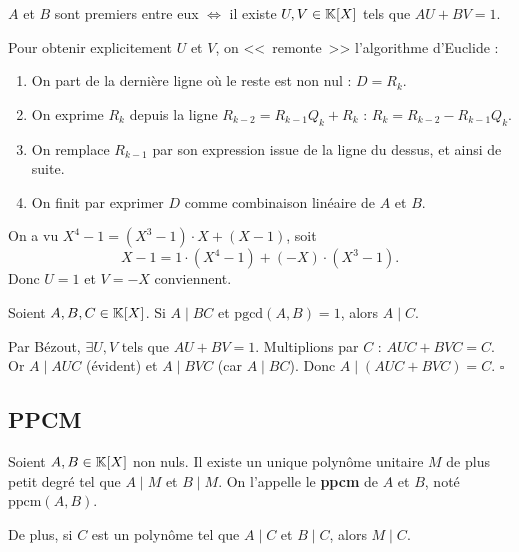 \begin{corollaire}
$A$ et $B$ sont premiers entre eux $\iff$ il existe $U, V \in \mathbb{K}[X]$ tels que $AU + BV = 1$.
\end{corollaire}

\begin{methodbox}
Pour obtenir explicitement $U$ et $V$, on <<~remonte~>> l'algorithme d'Euclide :
\begin{enumerate}[leftmargin=1.5cm]
  \item On part de la dernière ligne où le reste est non nul : $D = R_k$.
  \item On exprime $R_k$ depuis la ligne $R_{k-2} = R_{k-1} Q_k + R_k$ : $R_k = R_{k-2} - R_{k-1} Q_k$.
  \item On remplace $R_{k-1}$ par son expression issue de la ligne du dessus, et ainsi de suite.
  \item On finit par exprimer $D$ comme combinaison linéaire de $A$ et $B$.
\end{enumerate}
\end{methodbox}

\begin{exbox}
On a vu $X^4 - 1 = (X^3 - 1) \cdot X + (X - 1)$, soit
\[
  X - 1 = 1 \cdot (X^4 - 1) + (-X) \cdot (X^3 - 1).
\]
Donc $U = 1$ et $V = -X$ conviennent.
\end{exbox}

\begin{corollaire}
Soient $A, B, C \in \mathbb{K}[X]$. Si $A \mid BC$ et $\text{pgcd}(A, B) = 1$, alors $A \mid C$.
\end{corollaire}

\begin{proofbox}
Par Bézout, $\exists U, V$ tels que $AU + BV = 1$. Multiplions par $C$ : $A U C + B V C = C$. Or $A \mid AUC$ (évident) et $A \mid BVC$ (car $A \mid BC$). Donc $A \mid (AUC + BVC) = C$. \hfill$\square$
\end{proofbox}

\subsection{PPCM}

\begin{propbox}
Soient $A, B \in \mathbb{K}[X]$ non nuls. Il existe un unique polynôme unitaire $M$ de plus petit degré tel que $A \mid M$ et $B \mid M$. On l'appelle le \textbf{ppcm} de $A$ et $B$, noté $\text{ppcm}(A, B)$.

De plus, si $C$ est un polynôme tel que $A \mid C$ et $B \mid C$, alors $M \mid C$.
\end{propbox}

